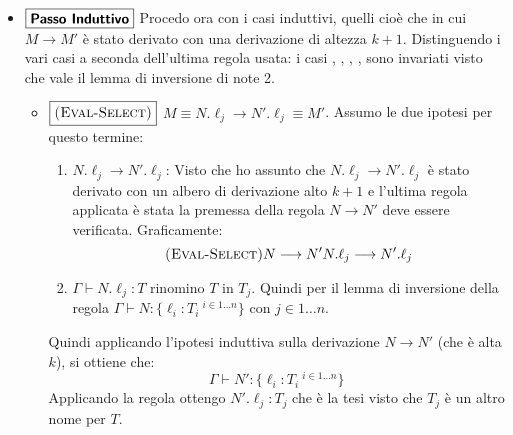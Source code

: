 \begin{itemize}
\begin{itemize}
		\item $\boxed{\myrule{Select}}$ $\{\ell_i = v_i^{i \in 1 \dots n}\}.\ell_j \longrightarrow v_j$, grazie all'assioma $\myrule{Select}$ (con $j \in 1 \dots n$). Per ipotesi
		$\Gamma \vdash \{\ell_i = v_i^{i \in 1 \dots n}\}.\ell_j$ ha tipo $T$. Per comodit\`a e in linea 
		con la regola $\myrule{Type-Select}$
		rinomino $T$ in $T_j$. Quindi per il lemma di inversione della regola $\myrule{Type-Select}$ ottengo che:
		$\Gamma \vdash M : \{\ell_i : T_i\ 	^{i\in 1 \dots n}\}$ con $j \in 1 \dots n$. Ora, siccome per la regola  $v_j$ \`e stato ottenuto dalla
		selezione del valore della label $\ell_j$ che ha tipo $T_j$, deduco che $v_j$
		ha il tipo $T_j$ cercato. Visto che $T_j$ non \`e altro che un alias per $T$
		la tesi \`e dimostrata.
	\end{itemize}
	\item $\boxed{\text{\textbf{Passo Induttivo}}}$
	Procedo ora con i casi induttivi, quelli cio\`e che in cui $M \longrightarrow M'$ \`e stato derivato
	con una derivazione di altezza $k+1$. Distinguendo
	i vari casi a seconda dell'ultima regola usata:
	i casi , , , , 
	sono invariati visto che vale il lemma di inversione di note 2.
	\begin{itemize}
	
		\item $\boxed{\textsc{(Eval-Select)}}$ $M \equiv N.\ell_j \longrightarrow N'.\ell_j \equiv M'$.
		Assumo le due ipotesi per questo termine:
		\begin{enumerate}
			\item $	N.\ell_j \longrightarrow N'.\ell_j$:
			Visto che ho assunto che $N.\ell_j \longrightarrow N'.\ell_j$ \`e stato derivato con un albero di derivazione alto
			$k+1$ e l'ultima regola applicata \`e stata  la premessa della regola $N \longrightarrow N'$ deve
			essere verificata. Graficamente:
			$$
			{\textsc{(Eval-Select)}}
			{N \longrightarrow N'}
			{N.\ell_j \longrightarrow N'.\ell_j}
			$$
			
			\item $\Gamma \vdash N.\ell_j : T$ rinomino $T$ in $T_j$. Quindi per il lemma di inversione della regola 
			$\Gamma \vdash N : \{\ell_i : T_i \ ^{i \in 1 \dots n}\}$ con $j \in 1 \dots n$.
		\end{enumerate}
		Quindi applicando l'ipotesi induttiva sulla derivazione $N \longrightarrow N'$ (che \`e alta $k$), si ottiene che:
		$$
		\Gamma \vdash N' : \{\ell_i : T_i\ ^{i \in 1 \dots n } \}
		$$
		Applicando la regola  ottengo $N'.\ell_j : T_j$ che \`e la tesi visto che $T_j$ \`e un altro nome per $T$.
		

\end{itemize}
\end{itemize}
